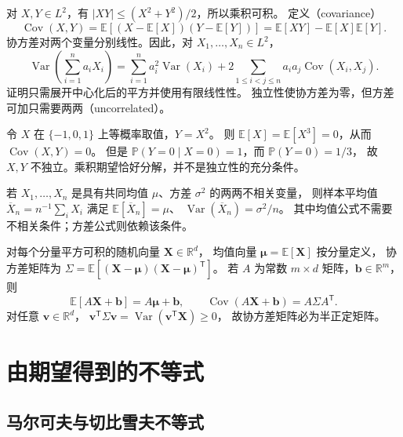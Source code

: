 \documentclass[UTF8]{ctexart}
\begin{document}
对 $X,Y\in L^2$，有 $|XY|\leq(X^2+Y^2)/2$，所以乘积可积。
定义（covariance）
\[
  \operatorname{Cov}(X,Y)
  =\mathbb E[(X-\mathbb E[X])(Y-\mathbb E[Y])]
  =\mathbb E[XY]-\mathbb E[X]\mathbb E[Y].
\]
协方差对两个变量分别线性。因此，对 $X_1,\ldots,X_n\in L^2$，
\begin{equation}
  \operatorname{Var}\!\left(\sum_{i=1}^n a_iX_i\right)
  =\sum_{i=1}^n a_i^2\operatorname{Var}(X_i)
   +2\sum_{1\leq i<j\leq n}a_ia_j\operatorname{Cov}(X_i,X_j).
  \label{eq:expectation-variance-sum}
\end{equation}
证明只需展开中心化后的平方并使用有限线性性。
独立性使协方差为零，但方差可加只需要两两（uncorrelated）。

\begin{example}[不相关不等于独立]
\label{ex:expectation-dependent-uncorrelated}
令 $X$ 在 $\{-1,0,1\}$ 上等概率取值，$Y=X^2$。
则 $\mathbb E[X]=\mathbb E[X^3]=0$，从而 $\operatorname{Cov}(X,Y)=0$。
但是 $\mathbb P(Y=0\mid X=0)=1$，而 $\mathbb P(Y=0)=1/3$，
故 $X,Y$ 不独立。乘积期望恰好分解，并不是独立性的充分条件。
\end{example}

若 $X_1,\ldots,X_n$ 是具有共同均值 $\mu$、方差 $\sigma^2$ 的两两不相关变量，
则样本平均值 $\overline X_n=n^{-1}\sum_iX_i$ 满足
$\mathbb E[\overline X_n]=\mu$、
$\operatorname{Var}(\overline X_n)=\sigma^2/n$。
其中均值公式不需要不相关条件；方差公式则依赖该条件。

对每个分量平方可积的随机向量 $\mathbf X\in\mathbb R^d$，
均值向量 $\boldsymbol\mu=\mathbb E[\mathbf X]$ 按分量定义，
协方差矩阵为 $\Sigma=\mathbb E[(\mathbf X-\boldsymbol\mu)(\mathbf X-\boldsymbol\mu)^{\mathsf T}]$。
若 $A$ 为常数 $m\times d$ 矩阵，$\mathbf b\in\mathbb R^m$，则
\[
  \mathbb E[A\mathbf X+\mathbf b]=A\boldsymbol\mu+\mathbf b,
  \qquad
  \operatorname{Cov}(A\mathbf X+\mathbf b)=A\Sigma A^{\mathsf T}.
\]
对任意 $\mathbf v\in\mathbb R^d$，
$\mathbf v^{\mathsf T}\Sigma\mathbf v=\operatorname{Var}(\mathbf v^{\mathsf T}\mathbf X)\geq0$，
故协方差矩阵必为半正定矩阵。

\section{由期望得到的不等式}
\label{sec:expectation-inequalities}

\subsection{马尔可夫与切比雪夫不等式}
\end{document}
